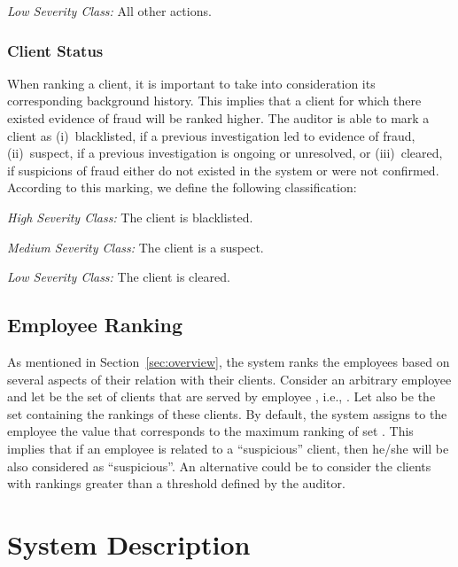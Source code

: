 \documentclass[conference]{IEEEtran}
\begin{document}
\emph{Low Severity Class: }All other actions.

\subsubsection{Client Status}
\label{sec:previous-client-ranking}

When ranking a client, it is important to take into consideration
its corresponding background history. This implies that a client for
which there existed evidence of fraud will be ranked higher. The
auditor is able to mark a client as (i)~blacklisted, if a previous
investigation led to evidence of fraud, (ii)~suspect, if a previous
investigation is ongoing or unresolved, or (iii)~cleared, if
suspicions of fraud either do not existed in the system or were not
confirmed. According to this marking, we define the following
classification:

\emph{High Severity Class:} The client is blacklisted.

\emph{Medium Severity Class:} The client is a suspect.

\emph{Low Severity Class:} The client is cleared.


\subsection{Employee Ranking}

As mentioned in Section~\ref{sec:overview}, the system ranks the
employees based on several aspects of their relation with their
clients. Consider an arbitrary employee   and let  be the
set of clients that are served by employee , i.e., . Let also 
be the set containing the rankings of these clients. By default, the
system assigns to the employee the value that corresponds to the
maximum ranking of set . This implies that if an employee is
related to a ``suspicious'' client, then he/she will be also
considered as ``suspicious''. An alternative could be to consider
the clients with rankings greater than a threshold defined by the
auditor.

\section{System Description}
\label{sec:description}
\end{document}
